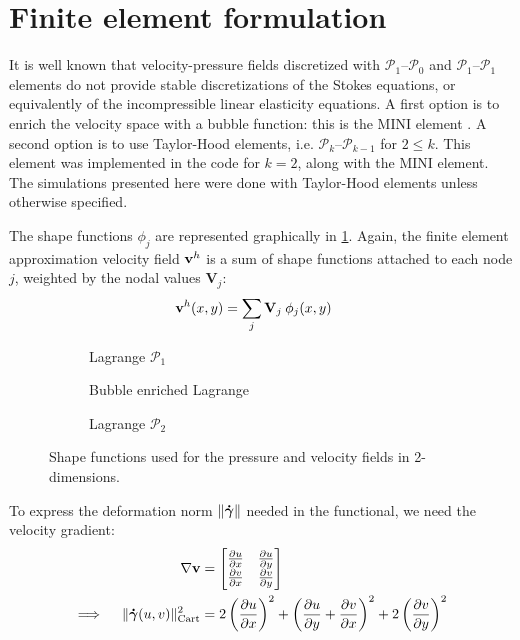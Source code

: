 \documentclass[11 pt]{report}
\begin{document}
\section{Finite element formulation}
It is well known that velocity-pressure fields discretized with $\mathcal{P}_1$--$\mathcal{P}_0$ and $\mathcal{P}_1$--$\mathcal{P}_1$ elements do not provide stable discretizations of the Stokes equations, or equivalently of the incompressible linear elasticity equations. A first option is to enrich the velocity space with a bubble function: this is the MINI element \cite{ministable}. A second option is to use Taylor-Hood elements, i.e. $\mathcal{P}_k$--$\mathcal{P}_{k-1}$ for $2 \leq k$. This element was implemented in the code for $k=2$, along with the MINI element. The simulations presented here were done with Taylor-Hood elements unless otherwise specified.

The shape functions $\phi_j$ are represented graphically in \cref{fig:shape_functions_2d}. Again, the finite element approximation velocity field $\mathbf{v}^h$ is a sum of shape functions attached to each node $j$, weighted by the nodal values $\mathbf{V}_j$:
\begin{align}
    \mathbf{v}^h(x, y) &= \sum_{j} \mathbf{V}_j \: \phi_j(x, y)
\end{align}

\begin{figure}[t]
    \centering
    \begin{subfigure}[t]{0.495\textwidth}
        
        \caption{Lagrange $\mathcal{P}_1$}
    \end{subfigure}
    \begin{subfigure}[t]{0.495\textwidth}
        
        \caption{Bubble enriched Lagrange}
    \end{subfigure}
    \begin{subfigure}[b]{\textwidth}
        
        \caption{Lagrange $\mathcal{P}_2$}
    \end{subfigure}
    \caption{Shape functions used for the pressure and velocity fields in 2-dimensions.}
    \label{fig:shape_functions_2d}
\end{figure} 

To express the deformation norm $\|\boldsymbol{\dot \gamma}\|$ needed in the functional, we need the velocity gradient:
\begin{align}
    \nabla \mathbf{v} &= 
    \begin{bmatrix}
        \pdv{u}{x} & \pdv{u}{y}\\
        \pdv{v}{x} & \pdv{v}{y}\\
    \end{bmatrix}\\
    \implies \quad \|\boldsymbol{\dot \gamma}(u, v)\|_{\text{Cart}}^2 &= 2 \left(\pdv{u}{x}\right)^2 + \left(\pdv{u}{y} + \pdv{v}{x}\right)^2 + 2\left(\pdv{v}{y}\right)^2
\end{align}
\end{document}

